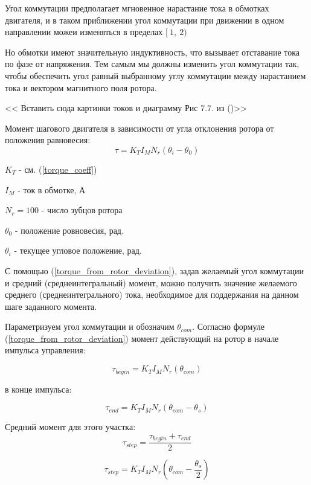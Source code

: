 Угол коммутации предполагает мгновенное нарастание тока в обмотках двигателя, и в таком приближении
угол коммутации при движении в одном направлении можеи изменяться в пределах $[~1,~2)$

Но обмотки имеют значительную индуктивность, что вызывает отставание тока по фазе от напряжения.
Тем самым мы должны изменить угол коммутации так, чтобы обеспечить угол равный выбранному углу
коммутации между нарастанием тока и вектором магнитного поля ротора.

<< Вставить сюда картинки токов и диаграмму Рис 7.7. из (\cite{Kenio})>>

Момент шагового двигателя в зависимости от угла отклонения ротора от положения равновесия:
\begin{equation}
    \label{torque_from_rotor_deviation}
    \tau = K_{T} I_{M} N_{r} ( \theta_{i} - \theta_{0} )
\end{equation}

$K_{T}$ - см. (\ref{torque_coeff})

$I_{M}$ - ток в обмотке, А

$N_{r} = 100$ - число зубцов ротора

$\theta_{0}$ - положение ровновесия, рад.

$\theta_{i}$ - текущее угловое положение, рад.
\newline
\newline

С помощью (\ref{torque_from_rotor_deviation}), задав желаемый угол коммутации и
средний (среднеинтегральный) момент, можно получить значение желаемого среднего
(среднеинтегрального) тока, необходимое для поддержания на данном шаге заданного момента.

Параметризуем угол коммутации и обозначим
$\theta_{com}$.
Согласно формуле (\ref{torque_from_rotor_deviation}) момент действующий на ротор
в начале импульса управления:

\begin{equation}
    \label{moment_to_rotor_at_the_begin_of_control_pulse}    
    \tau_{begin} = K_{T} I_{M} N_{r} ( \theta_{com} )
\end{equation}

в конце импульса:

\begin{equation}
    \label{moment_to_rotor_at_the_end_of_control_pulse}    
    \tau_{end} = K_{T} I_{M} N_{r} ( \theta_{com} - \theta_{s} )
\end{equation}

Средний момент для этого участка:
$$
    \tau_{step} = \frac{ \tau_{begin} + \tau_{end} }{ 2 }
$$

$$
    \tau_{step} = K_{T} I_{M} N_{r} ( \theta_{com} - \frac{ \theta_{s} }{ 2 } )
$$


